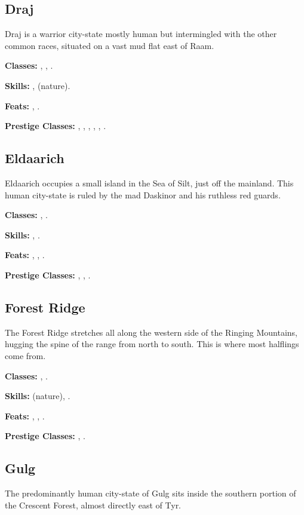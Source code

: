 \subsection{Draj}
Draj is a warrior city-state mostly human but intermingled with the other common races, situated on a vast mud flat east of Raam.

\textbf{Classes:} , , .

\textbf{Skills:} ,  (nature).

\textbf{Feats:} , .

\textbf{Prestige Classes:} , , , , , .

\subsection{Eldaarich}
Eldaarich occupies a small island in the Sea of Silt, just off the mainland. This human city-state is ruled by the mad Daskinor and his ruthless red guards.

\textbf{Classes:} , .

\textbf{Skills:} , .

\textbf{Feats:} , , .

\textbf{Prestige Classes:} , , .


\subsection{Forest Ridge}
The Forest Ridge stretches all along the western side of the Ringing Mountains, hugging the spine of the range from north to south. This is where most halflings come from.

\textbf{Classes:} , .

\textbf{Skills:}  (nature), .

\textbf{Feats:} , , .

\textbf{Prestige Classes:} , .


\subsection{Gulg}
The predominantly human city-state of Gulg sits inside the southern portion of the Crescent Forest, almost directly east of Tyr.

